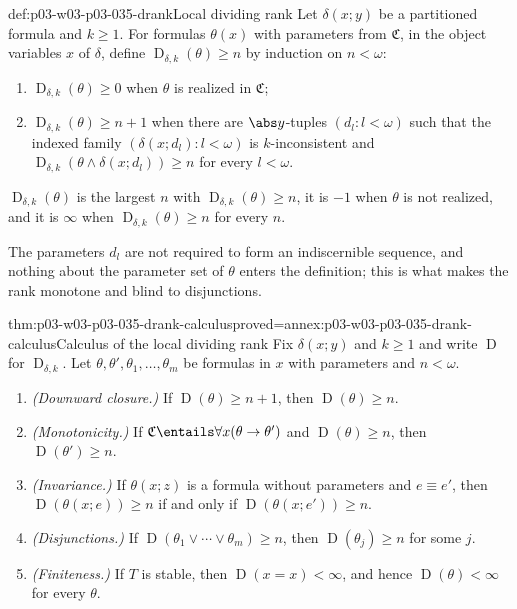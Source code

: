 \begin{hbdefinition}{def:p03-w03-p03-035-drank}{Local dividing rank}
Let \(\delta(x;y)\) be a partitioned formula and \(k\geq1\).  For formulas
\(\theta(x)\) with parameters from \(\mathfrak C\), in the object variables
\(x\) of \(\delta\), define \(\operatorname{D}_{\delta,k}(\theta)\geq n\) by
induction on \(n<\omega\):
\begin{enumerate}
  \item \(\operatorname{D}_{\delta,k}(\theta)\geq0\) when \(\theta\) is
        realized in \(\mathfrak C\);
  \item \(\operatorname{D}_{\delta,k}(\theta)\geq n+1\) when there are
        \(\abs y\)-tuples \((d_l:l<\omega)\) such that the indexed family
        \((\delta(x;d_l):l<\omega)\) is \(k\)-inconsistent and
        \(\operatorname{D}_{\delta,k}(\theta\wedge\delta(x;d_l))\geq n\) for
        every \(l<\omega\).
\end{enumerate}
\(\operatorname{D}_{\delta,k}(\theta)\) is the largest \(n\) with
\(\operatorname{D}_{\delta,k}(\theta)\geq n\), it is \(-1\) when \(\theta\) is
not realized, and it is \(\infty\) when
\(\operatorname{D}_{\delta,k}(\theta)\geq n\) for every \(n\).
\end{hbdefinition}

The parameters \(d_l\) are not required to form an indiscernible sequence,
and nothing about the parameter set of \(\theta\) enters the definition;
this is what makes the rank monotone and blind to disjunctions.

\begin{hblemma}{thm:p03-w03-p03-035-drank-calculus}{proved=annex:p03-w03-p03-035-drank-calculus}{Calculus of the local dividing rank}
Fix \(\delta(x;y)\) and \(k\geq1\) and write \(\operatorname{D}\) for
\(\operatorname{D}_{\delta,k}\).  Let \(\theta,\theta',\theta_1,\ldots,
\theta_m\) be formulas in \(x\) with parameters and \(n<\omega\).
\begin{enumerate}
  \item \emph{(Downward closure.)}  If \(\operatorname D(\theta)\geq n+1\),
        then \(\operatorname D(\theta)\geq n\).
  \item \emph{(Monotonicity.)}  If
        \(\mathfrak C\entails\forall x(\theta\rightarrow\theta')\) and
        \(\operatorname D(\theta)\geq n\), then
        \(\operatorname D(\theta')\geq n\).
  \item \emph{(Invariance.)}  If \(\theta(x;z)\) is a formula without
        parameters and \(e\equiv e'\), then
        \(\operatorname D(\theta(x;e))\geq n\) if and only if
        \(\operatorname D(\theta(x;e'))\geq n\).
  \item \emph{(Disjunctions.)}  If
        \(\operatorname D(\theta_1\vee\cdots\vee\theta_m)\geq n\), then
        \(\operatorname D(\theta_j)\geq n\) for some \(j\).
  \item \emph{(Finiteness.)}  If \(T\) is stable, then
        \(\operatorname D(x=x)<\infty\), and hence
        \(\operatorname D(\theta)<\infty\) for every \(\theta\).
\end{enumerate}
\end{hblemma}

